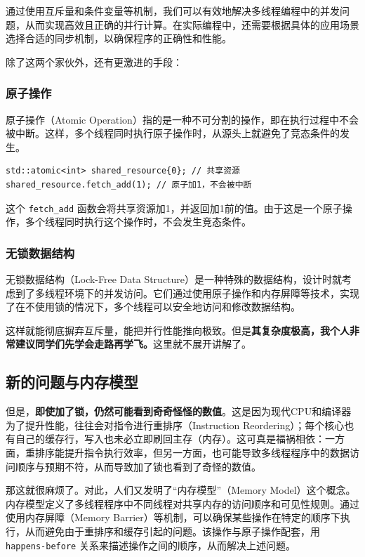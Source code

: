 通过使用互斥量和条件变量等机制，我们可以有效地解决多线程编程中的并发问题，从而实现高效且正确的并行计算。在实际编程中，还需要根据具体的应用场景选择合适的同步机制，以确保程序的正确性和性能。

除了这两个家伙外，还有更激进的手段：
\subsubsection{原子操作}

原子操作（Atomic Operation）指的是一种不可分割的操作，即在执行过程中不会被中断。这样，多个线程同时执行原子操作时，从源头上就避免了竞态条件的发生。

\begin{verbatim}
std::atomic<int> shared_resource{0}; // 共享资源
shared_resource.fetch_add(1); // 原子加1，不会被中断
\end{verbatim}
这个 \texttt{fetch\_add} 函数会将共享资源加1，并返回加1前的值。由于这是一个原子操作，多个线程同时执行这个操作时，不会发生竞态条件。

\subsubsection{无锁数据结构}

无锁数据结构（Lock-Free Data Structure）是一种特殊的数据结构，设计时就考虑到了多线程环境下的并发访问。它们通过使用原子操作和内存屏障等技术，实现了在不使用锁的情况下，多个线程可以安全地访问和修改数据结构。

这样就能彻底摒弃互斥量，能把并行性能推向极致。但是\textbf{其复杂度极高，我个人非常建议同学们先学会走路再学飞。}这里就不展开讲解了。

\subsection{新的问题与内存模型}

但是，\textbf{即使加了锁，仍然可能看到奇奇怪怪的数值}。这是因为现代CPU和编译器为了提升性能，往往会对指令进行重排序（Instruction Reordering）；每个核心也有自己的缓存行，写入也未必立即刷回主存（内存）。这可真是福祸相依：一方面，重排序能提升指令执行效率，但另一方面，也可能导致多线程程序中的数据访问顺序与预期不符，从而导致加了锁也看到了奇怪的数值。

那这就很麻烦了。对此，人们又发明了“内存模型”（Memory Model）这个概念。内存模型定义了多线程程序中不同线程对共享内存的访问顺序和可见性规则。通过使用内存屏障（Memory Barrier）等机制，可以确保某些操作在特定的顺序下执行，从而避免由于重排序和缓存引起的问题。该操作与原子操作配套，用 \texttt{happens-before} 关系来描述操作之间的顺序，从而解决上述问题。

